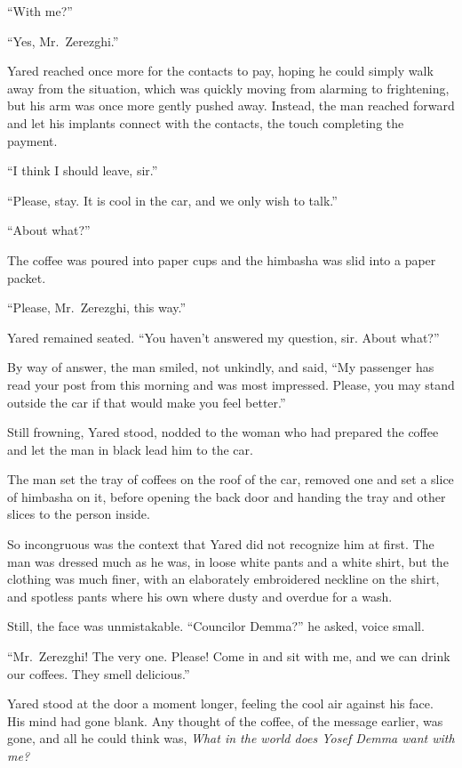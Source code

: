 ``With me?''

``Yes, Mr.~Zerezghi.''

Yared reached once more for the contacts to pay, hoping he could simply walk away from the situation, which was quickly moving from alarming to frightening, but his arm was once more gently pushed away. Instead, the man reached forward and let his implants connect with the contacts, the touch completing the payment.

``I think I should leave, sir.''

``Please, stay. It is cool in the car, and we only wish to talk.''

``About what?''

The coffee was poured into paper cups and the himbasha was slid into a paper packet.

``Please, Mr.~Zerezghi, this way.''

Yared remained seated. ``You haven't answered my question, sir. About what?''

By way of answer, the man smiled, not unkindly, and said, ``My passenger has read your post from this morning and was most impressed. Please, you may stand outside the car if that would make you feel better.''

Still frowning, Yared stood, nodded to the woman who had prepared the coffee and let the man in black lead him to the car.

The man set the tray of coffees on the roof of the car, removed one and set a slice of himbasha on it, before opening the back door and handing the tray and other slices to the person inside.

So incongruous was the context that Yared did not recognize him at first. The man was dressed much as he was, in loose white pants and a white shirt, but the clothing was much finer, with an elaborately embroidered neckline on the shirt, and spotless pants where his own where dusty and overdue for a wash.

Still, the face was unmistakable. ``Councilor Demma?'' he asked, voice small.

``Mr.~Zerezghi! The very one. Please! Come in and sit with me, and we can drink our coffees. They smell delicious.''

Yared stood at the door a moment longer, feeling the cool air against his face. His mind had gone blank. Any thought of the coffee, of the message earlier, was gone, and all he could think was, \emph{What in the world does Yosef Demma want with me?}

